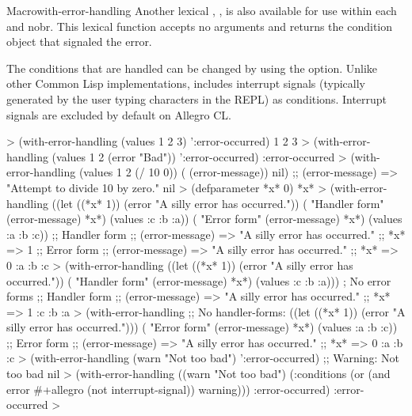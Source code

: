 \documentclass[10pt,twoside,english,pdftex]{article}
\begin{document}
\begin{functiondoc}{Macro}{with-error-handling}
Another lexical , , is also
available for use within each  and
nobr{}.  This lexical function accepts no arguments and
returns the condition object that signaled the error.

The conditions that are handled can be changed by using the
 option. Unlike other Common
Lisp implementations,  includes
interrupt signals (typically generated by the user typing
 characters in the REPL) as 
conditions.  Interrupt signals are excluded by default on Allegro CL.

%
\fnexamples
%
\W\supp
\begin{example}
  > (with-error-handling (values 1 2 3) ':error-occurred)
  1
  2
  3
  > (with-error-handling (values 1 2 (error "Bad")) ':error-occurred)
  :error-occurred
  > (with-error-handling (values 1 2 (/ 10 0)) ( (error-message)) nil)
  ;;  (error-message) => "Attempt to divide 10 by zero."
  nil\goodpagebreak
  > (defparameter *x* 0)
  *x*
  > (with-error-handling 
        ((let ((*x* 1))
           (error "A silly error has occurred."))
         ( "Handler form" (error-message) *x*)
         (values :c :b :a))
      ( "Error form" (error-message) *x*)
      (values :a :b :c))
  ;; Handler form
  ;;  (error-message) => "A silly error has occurred."
  ;;  *x* => 1
  ;; Error form
  ;;  (error-message) => "A silly error has occurred."
  ;;  *x* => 0
  :a
  :b
  :c\goodpagebreak
  > (with-error-handling 
        ((let ((*x* 1))
           (error "A silly error has occurred."))
         ( "Handler form" (error-message) *x*)
         (values :c :b :a)))          ; No error forms
  ;; Handler form
  ;;  (error-message) => "A silly error has occurred."
  ;;  *x* => 1
  :c
  :b
  :a\goodpagebreak
  > (with-error-handling 
        ;; No handler-forms:
        ((let ((*x* 1))
           (error "A silly error has occurred.")))
      ( "Error form" (error-message) *x*)
      (values :a :b :c))
  ;; Error form
  ;;  (error-message) => "A silly error has occurred."
  ;;  *x* => 0
  :a
  :b
  :c\goodpagebreak
  > (with-error-handling (warn "Not too bad") ':error-occurred)
  ;; Warning: Not too bad
  nil
  > (with-error-handling ((warn "Not too bad")
                          (:conditions (or (and error
                                                #+allegro
                                                (not interrupt-signal))
                                           warning))) 
      :error-occurred)
  :error-occurred
  >
\end{example}

\end{functiondoc}
\end{document}
